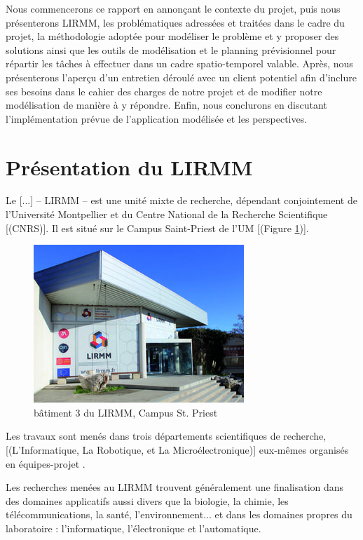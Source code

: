\documentclass[a4paper,12pt]{book}
\theoremstyle{break}
\theoremstyle{break}
\theoremstyle{break}
\theoremstyle{break}
\theoremstyle{definition}
\theoremstyle{remark}
\begin{document}
Nous commencerons ce rapport en annonçant le contexte du projet, puis nous présenterons LIRMM, les problématiques adressées et traitées dans le cadre du projet, la méthodologie adoptée pour modéliser le problème et y proposer des solutions ainsi que les outils de modélisation et le planning prévisionnel pour répartir les tâches à effectuer dans un cadre spatio-temporel valable. Après, nous présenterons l'aperçu d'un entretien déroulé avec un client potentiel afin d'inclure ses besoins dans le cahier des charges de notre projet et de modifier notre modélisation de manière à y répondre. Enfin, nous conclurons en discutant l'implémentation prévue de l'application modélisée et les perspectives.

\section{Présentation du LIRMM}
\og Le [...] – LIRMM – est une unité mixte de recherche, dépendant conjointement de l'Université Montpellier et du Centre National de la Recherche Scientifique [(CNRS)]. Il est situé sur le Campus Saint-Priest de l'UM [(Figure \ref{fig:lirmmPhoto})].

\begin{figure}[!ht]
  \centering
  \includegraphics[scale=0.9]{images/lirmmPhoto.jpg}
  \caption{bâtiment 3 du LIRMM, Campus St. Priest}
  \label{fig:lirmmPhoto}
\end{figure}

Les travaux sont menés dans trois départements scientifiques de recherche, [(L’Informatique, La Robotique, et La Microélectronique)] eux-mêmes organisés en \og équipes-projet \fg.

Les recherches menées au LIRMM trouvent généralement une finalisation dans des domaines applicatifs aussi divers que la biologie, la chimie, les télécommunications, la santé, l'environnement... et dans les domaines propres du laboratoire : l'informatique, l'électronique et l'automatique.
\end{document}

